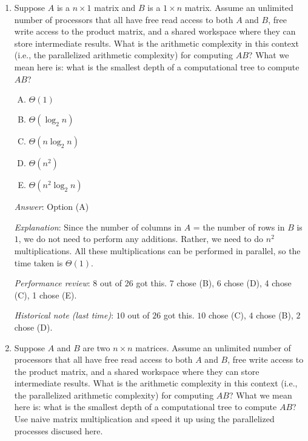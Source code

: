 \documentclass[10pt]{amsart}
\begin{document}
\begin{enumerate}
  {\em Performance review}: 11 out of 26 got this. 11 chose (C), 1
  chose (D), 3 chose (A).

  {\em Historical note (last time)}: $22$ out of $26$ got this. $2$ chose (C),
  $1$ each chose (A) and (D).

\item Suppose $A$ is a $n \times 1$ matrix and $B$ is a $1 \times n$
  matrix. Assume an unlimited number of processors that all have free
  read access to both $A$ and $B$, free write access to the product
  matrix, and a shared workspace where they can store intermediate
  results. What is the arithmetic complexity in this context (i.e.,
  the parallelized arithmetic complexity) for computing $AB$? What we
  mean here is: what is the smallest depth of a computational tree to
  compute $AB$?

  \begin{enumerate}[(A)]
  \item $\Theta(1)$
  \item $\Theta(\log_2 n)$
  \item $\Theta(n \log_2 n)$
  \item $\Theta(n^2)$
  \item $\Theta(n^2 \log_2 n)$
  \end{enumerate}

  {\em Answer}: Option (A)

  {\em Explanation}: Since the number of columns in $A$ = the number
  of rows in $B$ is $1$, we do not need to perform any
  additions. Rather, we need to do $n^2$ multiplications. All these
  multiplications can be performed in parallel, so the time taken is
  $\Theta(1)$.

  {\em Performance review}: 8 out of 26 got this. 7 chose (B), 6 chose
  (D), 4 chose (C), 1 chose (E).

  {\em Historical note (last time)}: $10$ out of $26$ got this. $10$ chose (C),
  $4$ chose (B), $2$ chose (D).
\item Suppose $A$ and $B$ are two $n \times n$ matrices. Assume an
  unlimited number of processors that all have free read access to
  both $A$ and $B$, free write access to the product matrix, and a
  shared workspace where they can store intermediate results. What is
  the arithmetic complexity in this context (i.e., the parallelized
  arithmetic complexity) for computing $AB$? What we mean here is:
  what is the smallest depth of a computational tree to compute $AB$?
  Use naive matrix multiplication and speed it up using the
  parallelized processes discused here.


\end{enumerate}
\end{document}
